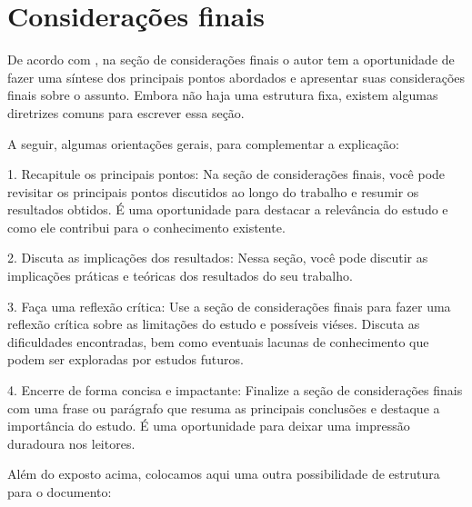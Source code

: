 \documentclass[
	article,			%
	12pt,				%
	oneside,			%
	a4paper,			%
	english,			%
	brazil,				%
	sumario=tradicional
	]{abntex2}
\begin{document}
% 

\section{Considerações finais}


De acordo com , na seção de considerações finais o autor tem a oportunidade de fazer uma síntese dos principais pontos abordados e apresentar suas considerações finais sobre o assunto. Embora não haja uma estrutura fixa, existem algumas diretrizes comuns para escrever essa seção.

A seguir, algumas orientações gerais, para complementar a explicação:

1. Recapitule os principais pontos: Na seção de considerações finais, você pode revisitar os principais pontos discutidos ao longo do trabalho e resumir os resultados obtidos. É uma oportunidade para destacar a relevância do estudo e como ele contribui para o conhecimento existente.

2. Discuta as implicações dos resultados: Nessa seção, você pode discutir as implicações práticas e teóricas dos resultados do seu trabalho. 

3. Faça uma reflexão crítica: Use a seção de considerações finais para fazer uma reflexão crítica sobre as limitações do estudo e possíveis viéses. Discuta as dificuldades encontradas, bem como eventuais lacunas de conhecimento que podem ser exploradas por estudos futuros.

4. Encerre de forma concisa e impactante: Finalize a seção de considerações finais com uma frase ou parágrafo que resuma as principais conclusões e destaque a importância do estudo. É uma oportunidade para deixar uma impressão duradoura nos leitores.

Além do exposto acima, colocamos aqui uma outra possibilidade de estrutura para o documento:
\end{document}
